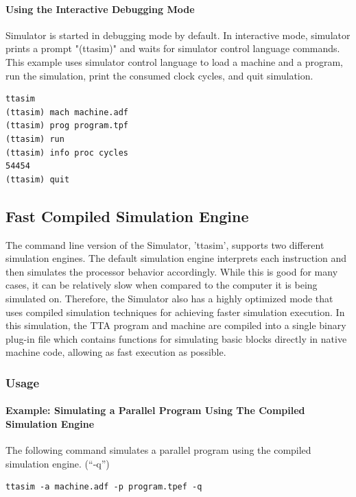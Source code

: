 \documentclass[twoside]{tceusermanual}
\begin{document}
\paragraph{Using the Interactive Debugging Mode}

Simulator is started in debugging mode by default. In interactive mode,
simulator prints a prompt "(ttasim)" and waits for simulator control language
commands. This example uses simulator control language to load a machine and a
program, run the simulation, print the consumed clock cycles, and quit
simulation.

\begin{verbatim}
ttasim
(ttasim) mach machine.adf
(ttasim) prog program.tpf
(ttasim) run
(ttasim) info proc cycles
54454
(ttasim) quit
\end{verbatim}

\subsection{Fast Compiled Simulation Engine}

The command line version of the Simulator, 'ttasim', supports two
different simulation engines. The default simulation engine interprets each
instruction and then simulates the processor behavior accordingly. While this is
good for many cases, it can be relatively slow when compared to the computer it
is being simulated on. Therefore, the Simulator also has a highly optimized 
mode that uses compiled simulation techniques for achieving faster simulation
execution. In this simulation, the TTA program and machine are compiled
into a single binary plug-in file which contains functions for simulating basic
blocks directly in native machine code, allowing as fast execution as possible.

\subsubsection{Usage}

\paragraph{Example: Simulating a Parallel Program Using The Compiled Simulation
Engine}

The following command simulates a parallel program using the compiled
simulation engine. (``-q'')

\begin{verbatim}
ttasim -a machine.adf -p program.tpef -q
\end{verbatim}
\end{document}
